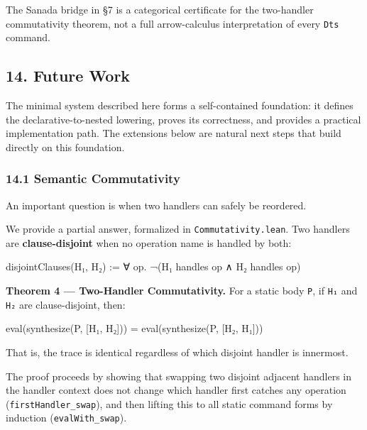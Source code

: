 \documentclass[
  11pt,
]{article}
\newenvironment{Shaded}{}{}
\newcommand{\NormalTok}[1]{#1}
\begin{document}
The Sanada bridge in §7 is a categorical certificate for the two-handler
commutativity theorem, not a full arrow-calculus interpretation of every
\texttt{Dts} command.

\subsection{14. Future Work}\label{future-work}

The minimal system described here forms a self-contained foundation: it
defines the declarative-to-nested lowering, proves its correctness, and
provides a practical implementation path. The extensions below are
natural next steps that build directly on this foundation.

\subsubsection{14.1 Semantic
Commutativity}\label{semantic-commutativity}

An important question is when two handlers can safely be reordered.

We provide a partial answer, formalized in \texttt{Commutativity.lean}.
Two handlers are \textbf{clause-disjoint} when no operation name is
handled by both:

\begin{Shaded}
\begin{Highlighting}[]
\NormalTok{disjointClauses(H₁, H₂) := ∀ op. ¬(H₁ handles op ∧ H₂ handles op)}
\end{Highlighting}
\end{Shaded}

\textbf{Theorem 4 --- Two-Handler Commutativity.} For a static body
\texttt{P}, if \texttt{H₁} and \texttt{H₂} are clause-disjoint, then:

\begin{Shaded}
\begin{Highlighting}[]
\NormalTok{eval(synthesize(P, [H₁, H₂])) = eval(synthesize(P, [H₂, H₁]))}
\end{Highlighting}
\end{Shaded}

That is, the trace is identical regardless of which disjoint handler is
innermost.

The proof proceeds by showing that swapping two disjoint adjacent
handlers in the handler context does not change which handler first
catches any operation (\texttt{firstHandler\_swap}), and then lifting
this to all static command forms by induction (\texttt{evalWith\_swap}).
\end{document}
